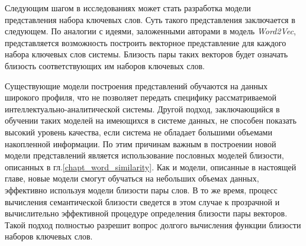 Следующим шагом в исследованиях может стать разработка модели представления набора ключевых слов. Суть такого представления заключается в следующем. По аналогии с идеями, заложенными авторами \cite{word2vec} в модель \emph{Word2Vec}, представляется возможность построить векторное представление для каждого набора ключевых слов системы. Близость пары таких векторов будет означать близость соответствующих им наборов ключевых слов.

Существующие модели построения представлений обучаются на данных широкого профиля, что не позволяет передать специфику рассматриваемой интеллектуально-аналитической системы. Другой подход, заключающийся в обучении таких моделей на имеющихся в системе данных, не способен показать высокий уровень качества, если система не обладает большими объемами накопленной информации. По этим причинам важным в построении новой модели представлений является использование пословных моделей близости, описанных в гл.\ref{chapt_word_similarity}. Как и модели, описанные в настоящей главе, новые модели смогут обучаться на небольших объемах данных, эффективно используя модели близости пары слов. В то же время, процесс вычисления семантической близости сведется в этом случае  к прозрачной и вычислительно эффективной процедуре определения близости пары векторов. Такой подход полностью разрешит вопрос долгого вычисления функции близости наборов ключевых слов.


